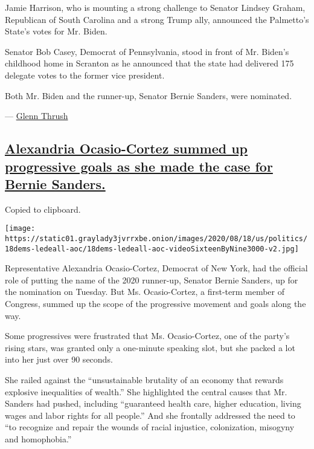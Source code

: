 Jamie Harrison, who is mounting a strong challenge to Senator Lindsey
Graham, Republican of South Carolina and a strong Trump ally, announced
the Palmetto's State's votes for Mr. Biden.

Senator Bob Casey, Democrat of Pennsylvania, stood in front of Mr.
Biden's childhood home in Scranton as he announced that the state had
delivered 175 delegate votes to the former vice president.

Both Mr. Biden and the runner-up, Senator Bernie Sanders, were
nominated.

--- \href{https://www.nytimes3xbfgragh.onion/by/glenn-thrush}{Glenn
Thrush}

\hypertarget{alexandria-ocasio-cortez-summed-up-progressive-goals-as-she-made-the-case-for-bernie-sanders}{%
\subsection{\texorpdfstring{\protect\hyperlink{alexandria-ocasio-cortez-summed-up-progressive-goals-as-she-made-the-case-for-bernie-sanders}{Alexandria
Ocasio-Cortez summed up progressive goals as she made the case for
Bernie
Sanders.}}{Alexandria Ocasio-Cortez summed up progressive goals as she made the case for Bernie Sanders.}}\label{alexandria-ocasio-cortez-summed-up-progressive-goals-as-she-made-the-case-for-bernie-sanders}}

Copied to clipboard.

\texttt{[image: https://static01.graylady3jvrrxbe.onion/images/2020/08/18/us/politics/18dems-ledeall-aoc/18dems-ledeall-aoc-videoSixteenByNine3000-v2.jpg]}

Representative Alexandria Ocasio-Cortez, Democrat of New York, had the
official role of putting the name of the 2020 runner-up, Senator Bernie
Sanders, up for the nomination on Tuesday. But Ms. Ocasio-Cortez, a
first-term member of Congress, summed up the scope of the progressive
movement and goals along the way.

Some progressives were frustrated that Ms. Ocasio-Cortez, one of the
party's rising stars, was granted only a one-minute speaking slot, but
she packed a lot into her just over 90 seconds.

She railed against the ``unsustainable brutality of an economy that
rewards explosive inequalities of wealth.'' She highlighted the central
causes that Mr. Sanders had pushed, including ``guaranteed health care,
higher education, living wages and labor rights for all people.'' And
she frontally addressed the need to ``to recognize and repair the wounds
of racial injustice, colonization, misogyny and homophobia.''

